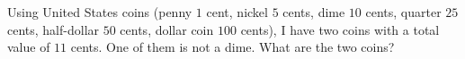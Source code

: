 Using United States coins (penny $1$ cent, nickel $5$ cents, dime $10$ cents, quarter $25$ cents, half-dollar $50$ cents, dollar coin $100$ cents), I have two coins with a total value of $11$ cents. One of them is not a dime. What are the two coins?
